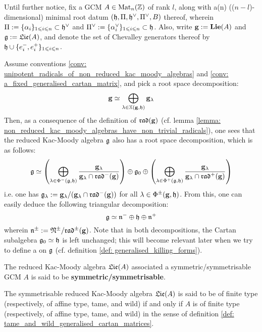             \begin{convention} \label{conv: a_fixed_generalised_cartan_matrix}
                Until further notice, fix a GCM $A \in \mathrm{Mat}_n(\mathbb{Z})$ of rank $l$, along with a(n) (($n - l$)-dimensional) minimal root datum $(\mathfrak{h}, \Pi, \mathfrak{h}^{\vee}, \Pi^{\vee}, B)$ thereof, wherein $\Pi := \{\alpha_i\}_{1 \leqslant i \leqslant n} \subset \mathfrak{h}^{\vee}$ and $\Pi^{\vee} := \{\alpha_i^{\vee}\}_{1 \leqslant i \leqslant n} \subset \mathfrak{h}$. Also, write $\mathbf{g} := \mathbf{Lie}(A)$ and $\mathfrak{g} := \mathfrak{Lie}(A)$, and denote the set of Chevalley generators thereof by $\mathfrak{h} \cup \{e_i^-, e_i^+\}_{1 \leqslant i \leqslant n}$. 
            \end{convention}
            \begin{remark} \label{remark: root_space_and_triangular_decompositions_of_reduced_kac_moody_algebras}
                Assume conventions \ref{conv: unipotent_radicals_of_non_reduced_kac_moody_algebras} and \ref{conv: a_fixed_generalised_cartan_matrix}, and pick a root space decomposition:
                    $$\mathbf{g} \simeq \bigoplus_{\lambda \in \mathbb{X}(\mathbf{g}, \mathfrak{h})} \mathbf{g}_{\lambda}$$
                Then, as a consequence of the definition of $\mathfrak{rad}(\mathbf{g})$ (cf. lemma \ref{lemma: non_reduced_kac_moody_algebras_have_non_trivial_radicals}), one sees that the reduced Kac-Moody algebra $\mathfrak{g}$ also has a root space decomposition, which is as follows:
                    $$\mathfrak{g} \simeq \left( \bigoplus_{\lambda \in \Phi^-(\mathfrak{g}, \mathfrak{h})} \frac{ \mathbf{g}_{\lambda} }{ \mathbf{g}_{\lambda} \cap \mathfrak{rad}^-(\mathbf{g}) } \right) \oplus \mathfrak{g}_0 \oplus \left( \bigoplus_{\lambda \in \Phi^+(\mathfrak{g}, \mathfrak{h})} \frac{ \mathbf{g}_{\lambda} }{ \mathbf{g}_{\lambda} \cap \mathfrak{rad}^+(\mathbf{g}) } \right)$$
                i.e. one has $\mathfrak{g}_{\lambda} := \mathbf{g}_{\lambda}/(\mathbf{g}_{\lambda} \cap \mathfrak{rad}^-(\mathbf{g}))$ for all $\lambda \in \Phi^{\pm}(\mathbf{g}, \mathfrak{h})$. From this, one can easily deduce the following triangular decomposition:
                    $$\mathfrak{g} \simeq \mathfrak{n}^- \oplus \mathfrak{h} \oplus \mathfrak{n}^+$$
                wherein $\mathfrak{n}^{\pm} := \mathfrak{N}^{\pm}/\mathfrak{rad}^{\pm}(\mathbf{g})$. Note that in both decompositions, the Cartan subalgebra $\mathfrak{g}_0 \simeq \mathfrak{h}$ is left unchanged; this will become relevant later when we try to define a  on $\mathfrak{g}$ (cf. definition \ref{def: generalised_killing_forms}).
            \end{remark}
            \begin{convention} \label{conv: tame_and_wild_reduced_kac_moody_algebras}
                The reduced Kac-Moody algebra $\mathfrak{Lie}(A)$ associated a symmetric/symmetrisable GCM $A$ is said to be \textbf{symmetric/symmetrisable}.
                
                The symmetrisable reduced Kac-Moody algebra $\mathfrak{Lie}(A)$ is said to be of finite type (respectively, of affine type, tame, and wild) if and only if $A$ is of finite type (respectively, of affine type, tame, and wild) in the sense of definition \ref{def: tame_and_wild_generalised_cartan_matrices}.
            \end{convention}
            
